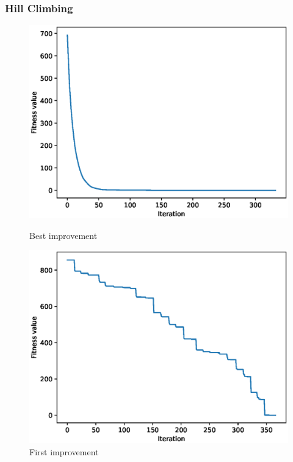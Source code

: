 \documentclass{article}
\begin{document}
\subsubsection{Hill Climbing}
\begin{figure}[!htbp]
	\centering
	\begin{minipage}{.48\textwidth}
		\centering
		\includegraphics[scale=.4]{experiment_2a_griewangk/max_fitness_0.eps}
		\caption{Best improvement}
	\end{minipage}\hfill
	\begin{minipage}{.48\textwidth}
		\centering
		\includegraphics[scale=.4]{experiment_2b_griewangk/max_fitness_0.eps}
		\caption{First improvement}
	\end{minipage}\hfill
\end{figure}
\FloatBarrier
\end{document}
